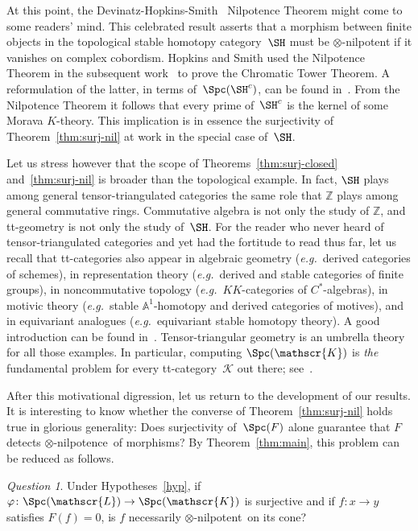 \documentclass{amsart}
\numberwithin{equation}{section}
\theoremstyle{remark}
\newtheorem{Que}[equation]{Question}
\begin{document}
At this point, the Devinatz-Hopkins-Smith~\cite{DevinatzHopkinsSmith88} Nilpotence Theorem might come to some readers' mind. This celebrated result asserts that a morphism between finite objects in the topological stable homotopy category~$\SH$ must be $\otimes$-nilpotent if it vanishes on complex cobordism. Hopkins and Smith used the Nilpotence Theorem in the subsequent work~\cite{HopkinsSmith98} to prove the Chromatic Tower Theorem. A reformulation of the latter, in terms of~$\Spc(\SH^c)$, can be found in~\cite[\S\,9]{Balmer10b}. From the Nilpotence Theorem it follows that every prime of~$\SH^c$ is the kernel of some Morava $K$-theory. This implication is in essence the surjectivity of Theorem~\ref{thm:surj-nil} at work in the special case of~$\SH$.

Let us stress however that the scope of Theorems~\ref{thm:surj-closed} and~\ref{thm:surj-nil} is broader than the topological example. In fact, $\SH$ plays among general tensor-triangulated categories the same role that ${\mathbb{Z}}$ plays among general commutative rings. Commutative algebra is not only the study of ${\mathbb{Z}}$, and tt-geometry is not only the study of~$\SH$. For the reader who never heard of tensor-triangulated categories and yet had the fortitude to read thus far, let us recall that tt-categories also appear in algebraic geometry ({{\sl e.g.}}\ derived categories of schemes), in representation theory ({{\sl e.g.}}\ derived and stable categories of finite groups), in noncommutative topology ({{\sl e.g.}}\ $KK$-categories of $C^*$-algebras), in motivic theory ({{\sl e.g.}}\ stable ${\mathbb{A}}^1$-homotopy and derived categories of motives), and in equivariant analogues ({{\sl e.g.}}\ equivariant stable homotopy theory). A good introduction can be found in~\cite[\S\,1.2]{HoveyPalmieriStrickland97}. Tensor-triangular geometry is an umbrella theory for all those examples. In particular, computing ${\Spc({\mathscr{K}})}$ is \emph{the} fundamental problem for every tt-category~${\mathscr{{K}}}$ out there; see~\cite[Thm.\,4.10]{Balmer05a}.

\medbreak

After this motivational digression, let us return to the development of our results. It is interesting to know whether the converse of Theorem~\ref{thm:surj-nil} holds true in glorious generality: Does surjectivity of~$\Spc(F)$ alone guarantee that $F$ detects {$\otimes$-nilpotence}\ of morphisms? By Theorem~\ref{thm:main}, this problem can be reduced as follows.
\begin{Que}
\label{que}Under Hypotheses~\ref{hyp}, if $\varphi\colon{\Spc({\mathscr{L}})}\to {\Spc({\mathscr{K}})}$ is surjective and if $f\colon x\to y$ satisfies $F(f)=0$, is $f$ necessarily {$\otimes$-nilpotent}\ on its cone?
\end{Que}
\end{document}
